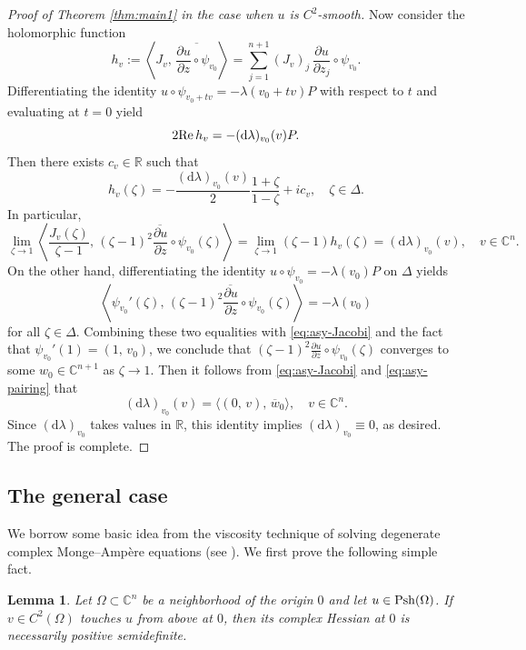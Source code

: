 \documentclass[12pt,a4paper]{amsart}
\numberwithin{equation}{section}
\newtheorem{lemma}[theorem]{Lemma}
\theoremstyle{definition}
\newcommand{\dd}{\mathrm d}
\begin{document}
\begin{proof}[Proof of Theorem \ref{thm:main1} in the case when $u$ is $C^2$-smooth]
Now consider the holomorphic function
\[
 h_v:=\left\langle J_v, \, \overline{\frac{\partial u}{\partial z}\circ\psi_{v_0}}\right\rangle
 =\sum_{j=1}^{n+1} (J_v)_j\,\frac{\partial u}{\partial z_j}\circ\psi_{v_0}.
\]
Differentiating the identity $u\circ\psi_{v_0+tv}=-\lambda(v_0+tv)P$ with respect to $t$ and evaluating at $t=0$ yield
\[
 2{\rm Re}\,h_v=-(\dd\lambda)_{v_0}(v)P.
\]
Then there exists $c_v\in\mathbb R$ such that
\[
 h_v(\zeta)=-\frac{(\dd\lambda)_{v_0}(v)}{2}\frac{1+\zeta}{1-\zeta}+ic_v, \quad \zeta\in\Delta.
\]
In particular,
\begin{equation}\label{eq:asy-pairing}
 \lim_{\zeta\to 1} \left\langle \frac{J_v(\zeta)}{\zeta-1}, \, \overline{(\zeta-1)^2\frac{\partial u}{\partial z}\circ\psi_{v_0}(\zeta)} \right\rangle
 =\lim_{\zeta\to1}(\zeta-1)h_v(\zeta)=(\dd\lambda)_{v_0}(v), \quad v\in\mathbb C^n.
\end{equation}
On the other hand, differentiating the identity $u\circ\psi_{v_0}=-\lambda(v_0)P$ on $\Delta$ yields
\[
 \left\langle
 \psi_{v_0}'(\zeta), \, \overline{(\zeta-1)^2\frac{\partial u}{\partial z}\circ\psi_{v_0}(\zeta)}
 \right\rangle
 =-\lambda(v_0)
\]
for all $\zeta\in\Delta$. Combining these two equalities with \eqref{eq:asy-Jacobi} and the fact that $\psi_{v_0}'(1)=(1,\, v_0)$, we conclude that $(\zeta-1)^2\frac{\partial u}{\partial z}\circ\psi_{v_0}(\zeta)$ converges to some $w_0\in\mathbb C^{n+1}$ as $\zeta\to1$. Then it follows from \eqref{eq:asy-Jacobi} and \eqref{eq:asy-pairing} that
\[
 (\dd\lambda)_{v_0}(v)=\big\langle(0,\,v), \, \overline{w}_0\big\rangle, \quad v\in\mathbb C^n.
\]
Since $(\dd\lambda)_{v_0}$ takes values in $\mathbb R$, this identity implies $(\dd\lambda)_{v_0}\equiv 0$, as desired. The proof is complete.
\end{proof}


\subsection{The general case}
We borrow some basic idea from the viscosity technique of solving degenerate complex Monge--Amp\`{e}re equations (see \cite{EGZ-CPAM11, GZ-MAeqnbook}). We first prove
the following simple fact.

\begin{lemma}\label{lem:viscosity}
Let $\Omega\subset\mathbb{C}^n$ be a neighborhood of the origin $0$ and let $u\in{\rm Psh}(\Omega)$. If $v\in C^2(\Omega)$ touches $u$ from above at $0$, then its complex Hessian at $0$ is necessarily positive semidefinite.
\end{lemma}
\end{document}
